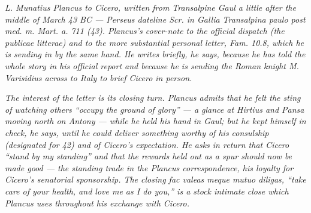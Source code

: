 
\textit{L. Munatius Plancus to Cicero, written from
Transalpine Gaul a little after the middle of March
43 BC --- Perseus dateline \textit{Scr. in Gallia
Transalpina paulo post med. m. Mart. a. 711 (43)}.
Plancus's cover-note to the official dispatch (the
\textit{publicae litterae}) and to the more substantial
personal letter, Fam. 10.8, which he is sending in by
the same hand. He writes briefly, he says, because he has
told the whole story in his official report and because
he is sending the Roman knight M. Varisidius across to
Italy to brief Cicero in person.}

\textit{The interest of the letter is its closing turn.
Plancus admits that he felt the sting of watching others
``occupy the ground of glory'' --- a glance at Hirtius
and Pansa moving north on Antony --- while he held his
hand in Gaul; but he kept himself in check, he says,
until he could deliver something worthy of his consulship
(designated for 42) and of Cicero's expectation. He asks
in return that Cicero ``stand by my standing'' and that
the rewards held out as a spur should now be made good ---
the standing trade in the Plancus correspondence, his
loyalty for Cicero's senatorial sponsorship. The closing
\textit{fac valeas meque mutuo diligas}, ``take care of
your health, and love me as I do you,'' is a stock
intimate close which Plancus uses throughout his exchange
with Cicero.}
